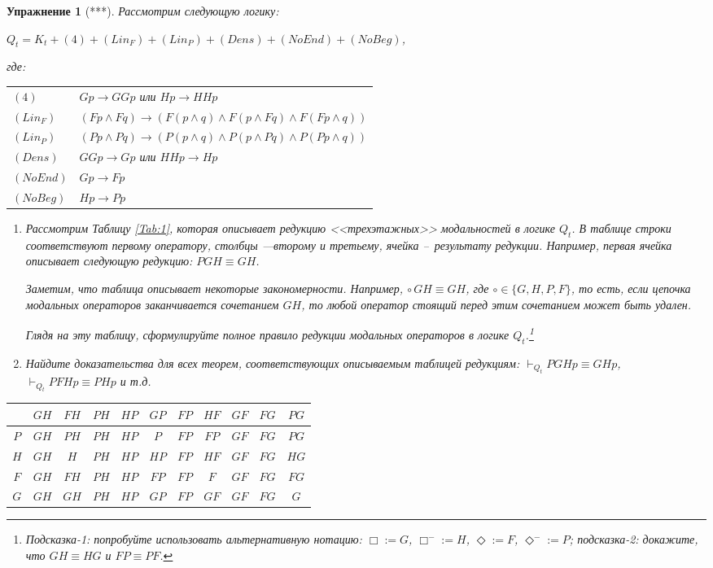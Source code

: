 \documentclass[11pt]{article}
\newtheorem{exercise}[theorem]{Упражнение}
\begin{document}
\begin{exercise}[***] Рассмотрим следующую логику: 
\begin{center}
$Q_t = K_t + (4) +  (Lin_F) + (Lin_P) + (Dens) + (NoEnd) + (NoBeg)$,	
\end{center}
где:
\begin{center}
\begin{tabular}{ll}
$(4)$ &  $Gp \to GGp$ или $Hp \to HHp$\\
$(Lin_F)$ & $(Fp \wedge Fq) \to (F(p \wedge q) \wedge F(p \wedge  Fq) \wedge F(Fp \wedge q)) $ \\
$(Lin_P)$ & $(Pp \wedge Pq) \to (P(p \wedge q) \wedge P(p \wedge  Pq) \wedge P(Pp \wedge q)) $ \\
$(Dens)$ & $GGp \to Gp$ или $HHp \to Hp$ \\
$(NoEnd)$  & $Gp \to Fp$ \\
$(NoBeg)$  & $Hp \to Pp$
\end{tabular}
\end{center}

\begin{enumerate}
\item 
Рассмотрим Таблицу \ref{Tab:1}, которая описывает редукцию <<трехэтажных>> модальностей в логике $Q_t$. В таблице строки соответствуют первому оператору, столбцы —второму и третьему, ячейка – результату редукции. Например, первая ячейка описывает следующую редукцию: $PGH \equiv GH$. 

Заметим, что таблица описывает некоторые закономерности. Например, $\circ \, GH \equiv GH$, где $\circ \in \{G, H, P, F \}$, то есть, если цепочка модальных операторов заканчивается сочетанием $GH$, то любой оператор стоящий перед этим сочетанием может быть удален.

 Глядя на эту таблицу, сформулируйте полное правило редукции модальных операторов в логике $Q_t$.\footnote{Подсказка-1: попробуйте использовать альтернативную нотацию: $\Box:= G$, $\Box^{-}:= H$, $\Diamond:= F$, $\Diamond^{-}:= P$; подсказка-2: докажите, что $GH \equiv HG$ и $FP \equiv PF$.}
\item  Найдите доказательства для всех теорем, соответствующих описываемым таблицей редукциям: $\vdash_{Q_t} PGHp \equiv GHp$, $\vdash_{Q_t} PFHp \equiv PHp$ и т.д.
\end{enumerate}


\begin{center}
\begin{table}[hbt]
\begin{tabular}{|c|c|c|c|c|c|c|c|c|c|c|}
\hline
    & $GH$ & $FH$ & $PH$ & $HP$ & $GP$ & $FP$ & $HF$ & $GF$ & $FG$ & $PG$ \\ \hline
$P$ & $GH$ & $PH$ & $PH$ & $HP$ & $P$  & $FP$ & $FP$ & $GF$ & $FG$ & $PG$ \\ \hline
$H$ & $GH$ & $H$  & $PH$ & $HP$ & $HP$ & $FP$ & $HF$ & $GF$ & $FG$ & $HG$ \\ \hline
$F$ & $GH$ & $FH$ & $PH$ & $HP$ & $FP$ & $FP$ & $F$  & $GF$ & $FG$ & $FG$ \\ \hline
$G$ & $GH$ & $GH$ & $PH$ & $HP$ & $GP$ & $FP$ & $GF$ & $GF$ & $FG$ & $G$  \\ \hline
\end{tabular}
 

\end{table}
\end{center}
\end{exercise}
\end{document}
